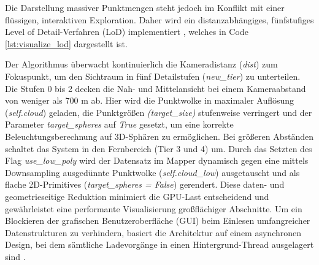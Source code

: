 Die Darstellung massiver Punktmengen steht jedoch im Konflikt mit einer flüssigen, interaktiven Exploration. Daher wird ein distanzabhängiges, fünfstufiges Level of Detail-Verfahren (\ac{LoD}) implementiert \cite{schutzRealTimeContinuousLevel2019}, welches in Code \ref{lst:visualize_lod} dargestellt ist.

Der Algorithmus überwacht kontinuierlich die Kameradistanz (\textit{dist}) zum Fokuspunkt, um den Sichtraum in fünf Detailstufen (\textit{new\_tier}) zu unterteilen. Die Stufen 0 bis 2 decken die Nah- und Mittelansicht bei einem Kameraabstand von weniger als 700 m ab. Hier wird die Punktwolke in maximaler Auflösung (\textit{self.cloud}) geladen, die Punktgrößen \textit{(target\_size)} stufenweise verringert und der Parameter \textit{target\_spheres} auf \textit{True} gesetzt, um eine korrekte Beleuchtungsberechnung auf 3D-Sphären zu ermöglichen. Bei größeren Abständen schaltet das System in den Fernbereich (Tier 3 und 4) um. Durch das Setzten des Flag \textit{use\_low\_poly} wird der Datensatz im Mapper dynamisch gegen eine mittels Downsampling ausgedünnte Punktwolke (\textit{self.cloud\_low}) ausgetauscht und als flache 2D-Primitives (\textit{target\_spheres = False}) gerendert. Diese daten- und geometrieseitige Reduktion minimiert die GPU-Last entscheidend und gewährleistet eine performante Visualisierung großflächiger Abschnitte. Um ein Blockieren der grafischen Benutzeroberfläche (\ac{GUI}) beim Einlesen umfangreicher Datenstrukturen zu verhindern, basiert die Architektur auf einem asynchronen Design, bei dem sämtliche Ladevorgänge in einen Hintergrund-Thread ausgelagert sind \cite{schutzSimLODSimultaneousLOD2024}.
